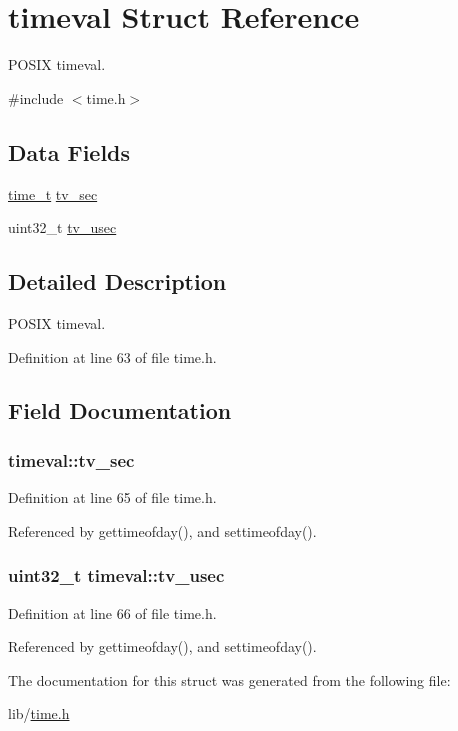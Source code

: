 \hypertarget{structtimeval}{\section{timeval Struct Reference}
\label{structtimeval}
}


P\-O\-S\-I\-X timeval.  




{\ttfamily \#include $<$time.\-h$>$}

\subsection*{Data Fields}
\begin{DoxyCompactItemize}
\item 
\hyperlink{posix_8h_a3346b04b0420b32ccf6b706551b70762}{time\-\_\-t} \hyperlink{structtimeval_aef6ddab1064c430758f9f913b7e4a21e}{tv\-\_\-sec}
\item 
uint32\-\_\-t \hyperlink{structtimeval_a8fd7abf5420981b3ff58bb23df458587}{tv\-\_\-usec}
\end{DoxyCompactItemize}


\subsection{Detailed Description}
P\-O\-S\-I\-X timeval. 

Definition at line 63 of file time.\-h.



\subsection{Field Documentation}
\hypertarget{structtimeval_aef6ddab1064c430758f9f913b7e4a21e}{
\subsubsection[{tv\-\_\-sec}]{ timeval\-::tv\-\_\-sec}}\label{structtimeval_aef6ddab1064c430758f9f913b7e4a21e}


Definition at line 65 of file time.\-h.



Referenced by gettimeofday(), and settimeofday().

\hypertarget{structtimeval_a8fd7abf5420981b3ff58bb23df458587}{
\subsubsection[{tv\-\_\-usec}]{\setlength{\rightskip}{0pt plus 5cm}uint32\-\_\-t timeval\-::tv\-\_\-usec}}\label{structtimeval_a8fd7abf5420981b3ff58bb23df458587}


Definition at line 66 of file time.\-h.



Referenced by gettimeofday(), and settimeofday().



The documentation for this struct was generated from the following file\-:\begin{DoxyCompactItemize}
\item 
lib/\hyperlink{time_8h}{time.\-h}\end{DoxyCompactItemize}
